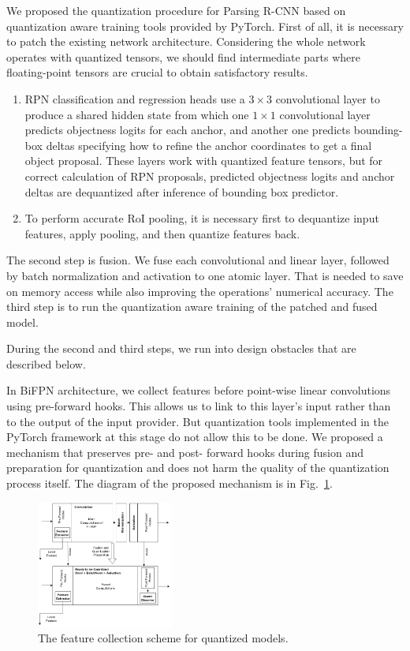 We proposed the quantization procedure for Parsing R-CNN based on quantization aware training tools provided by PyTorch. 
First of all, it is necessary to patch the existing network architecture. Considering the whole network operates with quantized tensors, we should find intermediate parts where floating-point tensors are crucial to obtain satisfactory results.
\begin{enumerate}
    \item RPN classification and regression heads use a $3\times3$ convolutional layer to produce a shared hidden state from which one $1\times1$ convolutional layer predicts objectness logits for each anchor, and another one predicts bounding-box deltas specifying how to refine the anchor coordinates to get a final object proposal. These layers work with quantized feature tensors, but for correct calculation of RPN proposals, predicted objectness logits and anchor deltas are dequantized after inference of bounding box predictor.
    \item To perform accurate RoI pooling, it is necessary first to dequantize input features, apply pooling, and then quantize features back.
\end{enumerate}

The second step is fusion. We fuse each convolutional and linear layer, followed by batch normalization and activation to one atomic layer. That is needed to save on memory access while also improving the operations' numerical accuracy.
The third step is to run the quantization aware training of the patched and fused model.

During the second and third steps, we run into design obstacles that are described below.

In BiFPN architecture, we collect features before point-wise linear convolutions using pre-forward hooks. This allows us to link to this layer's input rather than to the output of the input provider. But quantization tools implemented in the PyTorch framework at this stage do not allow this to be done. We proposed a mechanism that preserves pre- and post- forward hooks during fusion and preparation for quantization and does not harm the quality of the quantization process itself. The diagram of the proposed mechanism is in Fig.~\ref{fig:preserve_hooks}.

\begin{figure}[!hbtp]
\centering
\includegraphics[width=0.4\textwidth]{Figures/densepose/diagram.png}
\caption{The feature collection scheme for quantized models.}
\label{fig:preserve_hooks}
\end{figure}